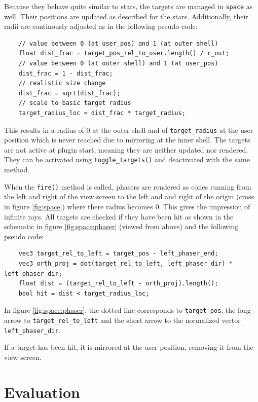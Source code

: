 \documentclass[hyperref, bachelorofscience]{cgvpub}
\begin{document}
Because they behave quite similar to stars, the targets are managed in \lstinline|space| as well. Their positions are updated as described for the stars. Additionally, their radii are continously adjusted as in the following pseudo code:
\vspace{.3cm}
\begin{lstlisting}
	// value between 0 (at user_pos) and 1 (at outer shell)
	float dist_frac = target_pos_rel_to_user.length() / r_out;
	// value between 0 (at outer shell) and 1 (at user_pos)
	dist_frac = 1 - dist_frac;
	// realistic size change
	dist_frac = sqrt(dist_frac);
	// scale to basic target radius
	target_radius_loc = dist_frac * target_radius;
\end{lstlisting}

This results in a radius of $ 0 $ at the outer shell and of \lstinline|target_radius| at the user position which is never reached due to mirroring at the inner shell. The targets are not active at plugin start, meaning they are neither updated nor rendered. They can be activated using \lstinline|toggle_targets()| and deactivated with the same method.

When the \lstinline|fire()| method is called, phasers are rendered as cones running from the left and right of the view screen to the left and and right of the origin (cross in figure \ref{fig:space}) where there radius becomes $ 0 $. This gives the impression of infinite rays. All targets are checked if they have been hit as shown in the schematic in figure \ref{fig:space:phaser} (viewed from above) and the following pseudo code:
\vspace{.3cm}
\begin{lstlisting}
	vec3 target_rel_to_left = target_pos - left_phaser_end;
	vec3 orth_proj = dot(target_rel_to_left, left_phaser_dir) * left_phaser_dir;
	float dist = (target_rel_to_left - orth_proj).length();
	bool hit = dist < target_radius_loc;
\end{lstlisting}

In figure \ref{fig:space:phaser}, the dotted line corresponds to \lstinline|target_pos|, the long arrow to \lstinline|target_rel_to_left| and the short arrow to the normalized vector \lstinline|left_phaser_dir|. 

If a target has been hit, it is mirrored at the user position, removing it from the view screen. 

\chapter{Evaluation}
\end{document}
